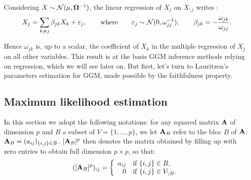 \begin{prop}\label{ggm:reg}
 Considering $X\sim \mathcal{N}(\mu, {\boldsymbol{\Omega}}^{-1})$, the linear regression of  $X_j$ on $X_{\setminus j}$ writes :
$$X_j = \sum_{k\neq j} \beta_{jk} X_k + \varepsilon_j,\qquad \text{where}\qquad\varepsilon_j \sim \mathcal{N} (0, \omega_{jj}^{-1}), \qquad \beta_{jk} = -\frac{\omega_{jk}}{\omega_{jj}}.$$

\end{prop}
Hence $\omega_{jk}$ is, up to a scalar, the coefficient of $X_k$ in the multiple regression of $X_j$ on all other variables. This result is at the basis GGM inference methods relying on regression, which we will see later on. But first, let's turn to Lauritzen's  parameters estimation for GGM, made possible by the faithfulness property.

 \subsection{Maximum likelihood estimation}\label{ggm:mle}
In this section we adopt the following notations: for any  squared  matrix ${\bf A}$ of dimension $p$ and $B$ a subset of $V=\{1,...,p\}$, we let ${\bf A}_B$ refer to the bloc $B$ of ${\bf A}$: ${\bf A}_{B}=(a_{ij})_{\{i,j\}\in B}$.   $[{\bf A}_B]^p$ then denotes the matrix obtained by filling up with zero entries to obtain full dimension $p\times p$, so that:
$$([{\bf A}_B]^p )_{ij}=\left\{ \begin{array}{rl}
a_{ij} & \text{if } \{i,j\}\in B,\\
0 &  \text{if } \{i,j\}\in V_{\setminus B}.
\end{array}\right.$$


